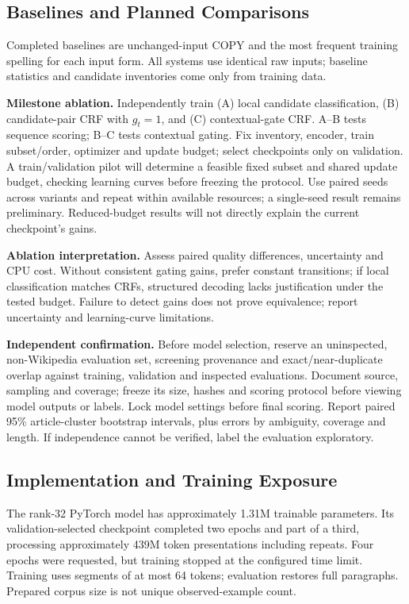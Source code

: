 \documentclass{article}
\begin{document}
\subsection{Baselines and Planned Comparisons}
Completed baselines are unchanged-input COPY and the most frequent training spelling for each input form. All systems use identical raw inputs; baseline statistics and candidate inventories come only from training data.

\textbf{Milestone ablation.} Independently train (A) local candidate classification, (B) candidate-pair CRF with $g_t=1$, and (C) contextual-gate CRF. A--B tests sequence scoring; B--C tests contextual gating. Fix inventory, encoder, train subset/order, optimizer and update budget; select checkpoints only on validation. A train/validation pilot will determine a feasible fixed subset and shared update budget, checking learning curves before freezing the protocol. Use paired seeds across variants and repeat within available resources; a single-seed result remains preliminary. Reduced-budget results will not directly explain the current checkpoint's gains.

\textbf{Ablation interpretation.} Assess paired quality differences, uncertainty and CPU cost. Without consistent gating gains, prefer constant transitions; if local classification matches CRFs, structured decoding lacks justification under the tested budget. Failure to detect gains does not prove equivalence; report uncertainty and learning-curve limitations.

\textbf{Independent confirmation.} Before model selection, reserve an uninspected, non-Wikipedia evaluation set, screening provenance and exact/near-duplicate overlap against training, validation and inspected evaluations. Document source, sampling and coverage; freeze its size, hashes and scoring protocol before viewing model outputs or labels. Lock model settings before final scoring. Report paired 95\% article-cluster bootstrap intervals, plus errors by ambiguity, coverage and length. If independence cannot be verified, label the evaluation exploratory.

\subsection{Implementation and Training Exposure}
The rank-32 PyTorch model has approximately 1.31M trainable parameters. Its validation-selected checkpoint completed two epochs and part of a third, processing approximately 439M token presentations including repeats. Four epochs were requested, but training stopped at the configured time limit. Training uses segments of at most 64 tokens; evaluation restores full paragraphs. Prepared corpus size is not unique observed-example count.
\end{document}
